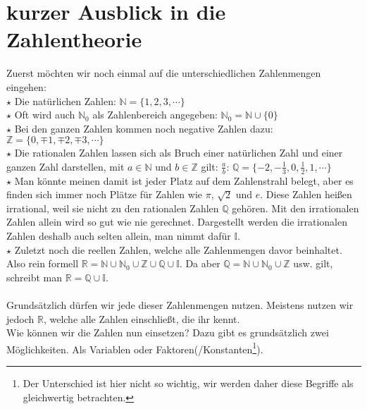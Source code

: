 \section{kurzer Ausblick in die Zahlentheorie}
	Zuerst möchten wir noch einmal auf die unterschiedlichen Zahlenmengen eingehen:\\
	
	\(\star\) Die natürlichen Zahlen: \(\mathbb{N}=\{1,2,3,\cdots\}\) \\
	
	\(\star\) Oft wird auch \(\mathbb{N}_0\) als Zahlenbereich angegeben:
	\(\mathbb{N}_0=\mathbb{N}\cup\{0\}\)\\
	
	\(\star\) Bei den ganzen Zahlen kommen noch negative Zahlen dazu:
	\(\mathbb{Z}=\{0,\mp 1,\mp 2,\mp 3,\cdots\}\) \\
	
	\(\star\) Die rationalen Zahlen lassen sich als Bruch einer natürlichen Zahl
	und einer ganzen Zahl darstellen, mit \(a\in\mathbb{N}\) und \(b\in\mathbb{Z}\)
	gilt: \(\frac{a}{b}\):
	\(\mathbb{Q}=\{-2,-\frac{1}{3},0,\frac{1}{2},1,\cdots\}\) \\
	
	$\star$ Man könnte meinen damit ist jeder Platz auf dem Zahlenstrahl belegt,
	aber es finden sich immer noch Plätze für Zahlen wie \(\pi\), \(\sqrt{2}\) und
	\(e\).
	Diese Zahlen heißen irrational, weil sie nicht zu den rationalen Zahlen
	\(\mathbb{Q}\) gehören. Mit den irrationalen Zahlen allein wird so gut wie nie
	gerechnet. Dargestellt werden die irrationalen Zahlen deshalb auch selten
	allein, man nimmt dafür \(\mathbb{I}\).\\

	\(\star\) Zuletzt noch die reellen Zahlen, welche alle Zahlenmengen davor
	beinhaltet. Also rein formell
	\(\mathbb{R}=\mathbb{N}\cup\mathbb{N}_0\cup\mathbb{Z}\cup\mathbb{Q}\cup\mathbb{I}\).
	Da aber \(\mathbb{Q}=\mathbb{N}\cup\mathbb{N}_0\cup\mathbb{Z}\) usw. gilt,
	schreibt man \(\mathbb{R}=\mathbb{Q}\cup\mathbb{I}\). \\ \\
	
	Grundsätzlich dürfen wir jede dieser Zahlenmengen nutzen. Meistens nutzen wir
	jedoch \(\mathbb{R}\), welche alle Zahlen einschließt, die ihr kennt. \\
	Wie können wir die Zahlen nun einsetzen? Dazu gibt es grundsätzlich zwei
	Möglichkeiten. Als Variablen oder Faktoren(/Konstanten\footnote{Der Unterschied
	ist hier nicht so wichtig, wir werden daher diese Begriffe als gleichwertig
	betrachten.}).\\
	
